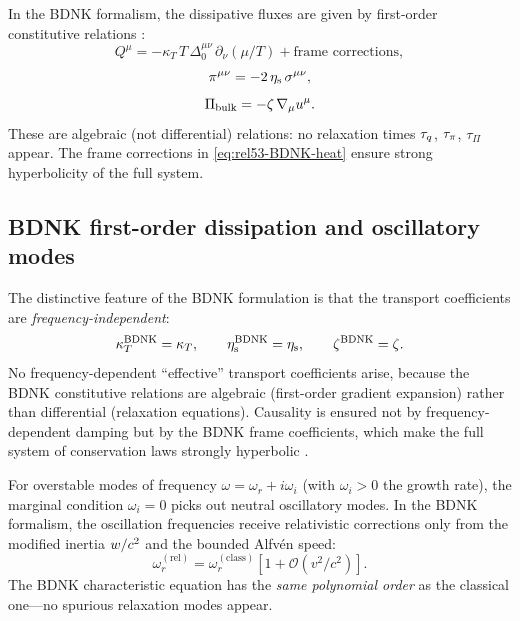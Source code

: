 In the BDNK formalism, the dissipative fluxes are given by
first-order constitutive relations \citep{BemficaDN2018,Kovtun2019}:
\begin{equation}
  Q^{\mu}
  = -\kappa_T\,T\,\Delta^{\mu\nu}_0\,\partial_{\nu}(\mu/T)
    + \text{frame corrections},
  \label{eq:rel53-BDNK-heat}
\end{equation}
\begin{equation}
  \pi^{\mu\nu}
  = -2\,\eta_{\mathrm{s}}\,\sigma^{\mu\nu},
  \label{eq:rel53-BDNK-shear}
\end{equation}
\begin{equation}
  \Pi_{\mathrm{bulk}}
  = -\zeta\,\nabla_{\mu}u^{\mu}.
  \label{eq:rel53-BDNK-bulk}
\end{equation}
These are algebraic (not differential) relations: no relaxation times
$\tau_{q}$, $\tau_{\pi}$, $\tau_{\Pi}$ appear.  The frame corrections in
\eqref{eq:rel53-BDNK-heat} ensure strong hyperbolicity of the full
system.

\subsection{BDNK first-order dissipation and oscillatory modes}

The distinctive feature of the BDNK formulation is that the transport
coefficients are \emph{frequency-independent}:
\begin{equation}
  \kappa_T^{\mathrm{BDNK}} = \kappa_T,\qquad
  \eta_{\mathrm{s}}^{\mathrm{BDNK}} = \eta_{\mathrm{s}},\qquad
  \zeta^{\mathrm{BDNK}} = \zeta.
  \label{eq:rel53-BDNK-transport}
\end{equation}
No frequency-dependent ``effective'' transport coefficients arise, because
the BDNK constitutive relations are algebraic (first-order gradient
expansion) rather than differential (relaxation equations).  Causality
is ensured not by frequency-dependent damping but by the BDNK frame
coefficients, which make the full system of conservation laws strongly
hyperbolic \citep{BemficaDN2018,Kovtun2019,HoultKovtun2020}.

For overstable modes of frequency $\omega = \omega_r + i\omega_i$ (with
$\omega_i>0$ the growth rate), the marginal condition $\omega_i = 0$
picks out neutral oscillatory modes.  In the BDNK formalism, the
oscillation frequencies receive relativistic corrections only from the
modified inertia $w/c^{2}$ and the bounded Alfv\'en speed:
\begin{equation}
  \omega_r^{(\mathrm{rel})} = \omega_r^{(\mathrm{class})}
  \left[1 + \mathcal{O}(v^{2}/c^{2})\right].
  \label{eq:rel53-freq-shift}
\end{equation}
The BDNK characteristic equation has the \emph{same polynomial order}
as the classical one---no spurious relaxation modes appear.

